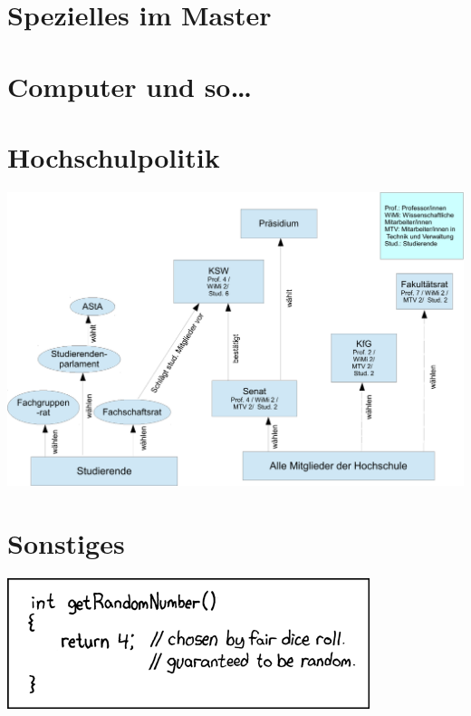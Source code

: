 \documentclass[]{papertex}
\begin{document}
	\section{Spezielles im Master}
		\label{master}
		
	\newpage

	\section{Computer und so\ldots}
		\label{computer}
		
	\newpage

	\section{Hochschulpolitik}
		\label{politik}
		\begin{minipage}[H]{1.0\linewidth}
		\begin{center}
			\centering
			\includegraphics[width=\textwidth]{bilder/gremienkunde/gremienkunde3}
		\end{center}
		\end{minipage}
		\vspace{0.5cm}
		
		\begin{multicols}{2}
		
		
		\end{multicols}
	\newpage

	\section{Sonstiges}
		\label{sonstiges}
		\begin{center}
		\includegraphics[totalheight=3cm]{bilder/XKCD/random_number}
		\end{center}
		\begin{multicols}{2}
		
		
		\end{multicols}
		\newpage
		
		\newpage
		
\end{document}
